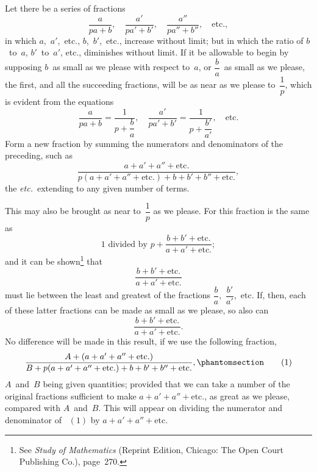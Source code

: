 \documentclass[12pt]{book}[2005/09/16]
\newcommand{\Typo}[2]{#2}
\newcommand{\Chg}[2]{#2}
\newcommand{\Add}[1]{\Chg{}{#1}}
\newcounter{SecNo}
\newcommand{\Pagelabel}[1]{\phantomsection\label{page:#1}}
\newcommand{\PageSep}[1]{\Pagelabel{#1}\ignorespaces}
\renewcommand{\etc}{\text{etc}}
\renewcommand{\(}{{\upshape(}}
\renewcommand{\)}{{\upshape)}}
\newcommand{\Title}[1]{\textit{#1}}
\newcommand{\Tag}[1]{%
  \phantomsection\label{eqn:\theSecNo.#1}\tag*{\ensuremath{#1}}%
}
\newcommand{\Eq}[2][\theSecNo]{%
  \hyperref[eqn:#1.#2]{\ensuremath{#2}}%
}
\begin{document}
Let there be a series of fractions
\[
\frac{a}{pa + b},\quad
\frac{a'}{pa' + b'},\quad
\frac{a''}{pa'' + b''},\quad \etc.,
\]
in which $a$,~$a'$,~etc., $b$,~$b'$,~etc., increase without limit;
but in which the ratio of $b$~to~$a$, $b'$~to~$a'$, etc., diminishes
without limit. If it be allowable to begin by
\PageSep{71}
supposing $b$~as small as we please with respect to~$a$,
or $\dfrac{b}{a}$~as small as we please, the first, and all the succeeding
fractions, will be as near as we please to~$\dfrac{1}{p}$,
which is evident from the equations
\[
\frac{a}{pa + b} = \frac{1}{p + \dfrac{b}{a}},\quad
\frac{a'}{pa' + b'} = \frac{1}{p + \dfrac{b'}{a'}},\quad \etc.
\]
Form a new fraction by summing the numerators and
denominators of the preceding, such as
\[
\frac{a + a' + a'' + \etc.}
     {p(a + a' + a'' + \etc.) + b + b' + b'' + \etc.\Typo{,}{}},
\]
the \emph{etc.}\ extending to any given number of terms.

This may also be brought as near to~$\dfrac{1}{p}$ as we please.
For this fraction is the same as
\[
\text{$1$~divided by } p + \frac{b + b' + \etc.}{a + a' + \etc.};
\]
and it can be shown\footnote
  {See \Title{Study of Mathematics} (Reprint Edition, Chicago: The Open Court
  Publishing Co.), page~270.}
that
\[
\frac{b + b' + \etc.}{a + a' + \etc.}
\]
must lie between the least and greatest of the fractions
$\dfrac{b}{a}$,~$\dfrac{b'}{a'}$,~etc.
If, then, each of these latter fractions
can be made as small as we please, so also can
\[
\frac{b + b' + \etc.}{a + a' + \etc.}.
\]
No difference will be made in this result, if we use
the following fraction,
\[
\frac{A + (a + a' + a'' + \etc.)}
     {B + p(a + a' + a'' + \etc.) + b + b' + b'' + \etc.}\Add{,}
\Tag{(1)}
\]
\PageSep{72}
$A$~and~$B$ being given quantities; provided that we
can take a number of the original fractions sufficient
to make $a + a' + a'' + \etc.$, as great as we please,
compared with $A$~and~$B$. This will appear on dividing
the numerator and denominator of~\Eq{(1)} by $a + a' + a'' + \etc$.
\end{document}
